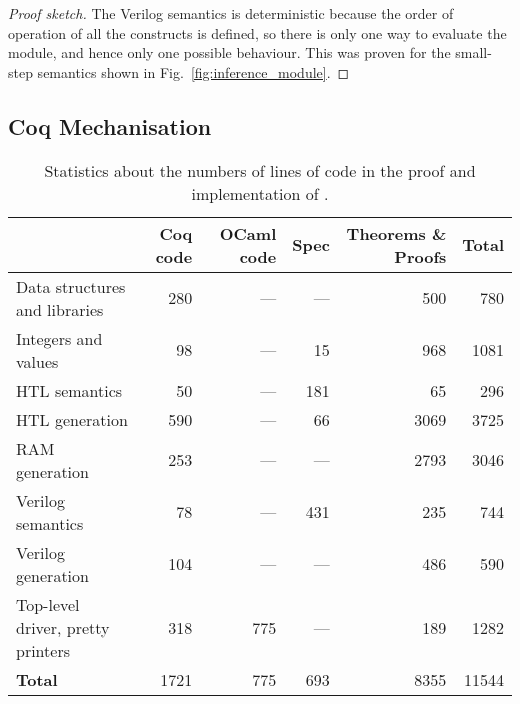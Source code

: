 \begin{proof}[Proof sketch]
  The Verilog semantics is deterministic because the order of operation of all the constructs is defined, so there is only one way to evaluate the module, and hence only one possible behaviour. This was proven for the small-step semantics shown in Fig.~\ref{fig:inference_module}.
\end{proof}



\subsection{Coq Mechanisation}

\begin{table}
  \centering
  \caption{Statistics about the numbers of lines of code in the proof and implementation of \vericert{}.}\label{tab:proof_statistics}
  \begin{tabular}{lrrrrr}
    \toprule
    & \textbf{Coq code} & \multicolumn{1}{p{1cm}}{\raggedleft\textbf{OCaml code}} & \textbf{Spec} & \multicolumn{1}{p{2cm}}{\raggedleft\textbf{Theorems \& Proofs}} & \textbf{Total}\\
    \midrule
    {Data structures and libraries}     & 280  & --- & ---  & 500  & 780   \\
    {Integers and values}               & 98   & --- & 15   & 968  & 1081  \\
    {HTL semantics}                     & 50   & --- & 181  & 65   & 296   \\
    {HTL generation}                    & 590  & --- & 66   & 3069 & 3725  \\
    {RAM generation}                    & 253  & --- & ---  & 2793 & 3046  \\
    {Verilog semantics}                 & 78   & --- & 431  & 235  & 744   \\
    {Verilog generation}                & 104  & --- & ---  & 486  & 590   \\
    {Top-level driver, pretty printers} & 318  & 775 & ---  & 189  & 1282  \\
    \midrule
    \textbf{Total}                      & 1721 & 775 & 693  & 8355 & 11544 \\
    \bottomrule
  \end{tabular}
\end{table}

